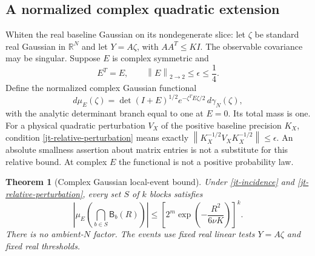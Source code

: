 \documentclass[11pt]{article}
\newtheorem{theorem}{Theorem}[section]
\theoremstyle{remark}
\newcommand{\norm}[1]{\left\|#1\right\|}
\begin{document}
\subsection{A normalized complex quadratic extension}
\label{jt-complex-section}

Whiten the real baseline Gaussian on its nondegenerate slice:
let $\zeta$ be standard real Gaussian in $\mathbb R^N$ and
let $Y=A\zeta$, with $AA^T\le KI$. The observable covariance
may be singular. Suppose $E$ is complex symmetric and
\begin{equation}\label{jt-relative-perturbation}
 E^T=E,\qquad \norm E_{2\to2}\le\epsilon\le\frac14.
\end{equation}
Define the normalized complex Gaussian functional
\begin{equation}\label{jt-complex-measure}
 d\mu_E(\zeta)=\det(I+E)^{1/2}
      e^{-\zeta^TE\zeta/2}\,d\gamma_N(\zeta),
\end{equation}
with the analytic determinant branch equal to one at $E=0$.
Its total mass is one. For a physical quadratic perturbation
$V_X$ of the positive baseline precision $K_X$, condition
\eqref{jt-relative-perturbation} means exactly
$\norm{K_X^{-1/2}V_XK_X^{-1/2}}\le\epsilon$.
An absolute smallness assertion about matrix entries is not a
substitute for this relative bound. At complex $E$ the functional
is not a positive probability law.

\begin{theorem}[Complex Gaussian local-event bound]
\label{jt-complex-theorem}
Under \eqref{jt-incidence} and
\eqref{jt-relative-perturbation}, every set $S$ of $k$ blocks
satisfies
\begin{equation}\label{jt-complex-bound}
 \boxed{\quad
 \left|\mu_E\!\left(\bigcap_{b\in S}\mathsf B_b(R)\right)\right|
 \le\left[2^m\exp\!\left(-\frac{R^2}{6\nu K}\right)\right]^k.
 \quad}
\end{equation}
There is no ambient-$N$ factor. The events use fixed real linear
tests $Y=A\zeta$ and fixed real thresholds.
\end{theorem}
\end{document}
